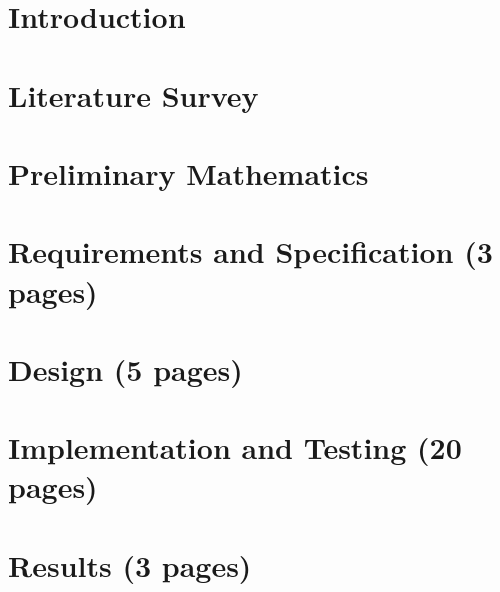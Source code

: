 
%
%
%
%
%
%
%
%
%


\setcounter{page}{1}



\chapter{Introduction}

\chapter{Literature Survey}

\chapter{Preliminary Mathematics}


\chapter{Requirements and Specification (3 pages)}


\chapter{Design (5 pages)}


\chapter{Implementation and Testing (20 pages)}


\chapter{Results (3 pages)}


